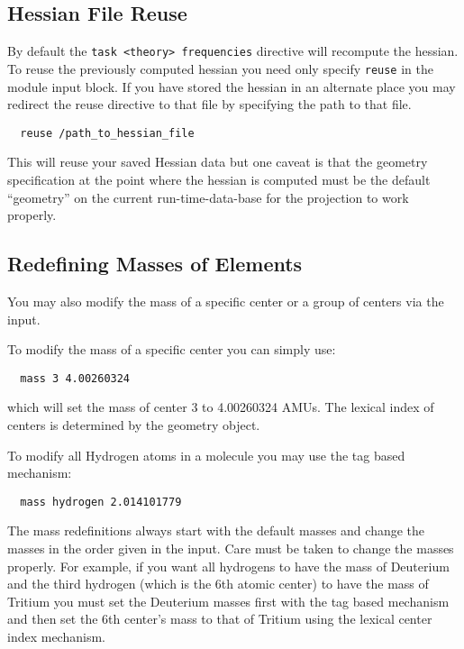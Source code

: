 \subsection{Hessian File Reuse}
By default the \verb+task <theory> frequencies+ directive will
recompute the hessian.  To reuse the previously computed hessian you
need only specify \verb+reuse+ in the module input block.  If you
have stored the hessian in an alternate place you may redirect the 
reuse directive to that file by specifying the path to that file.
\begin{verbatim}
  reuse /path_to_hessian_file
\end{verbatim}
This will reuse your saved Hessian data but one caveat is that the
geometry specification at the point where the hessian is computed must
be the default ``geometry'' on the current run-time-data-base for the
projection to work properly.

\subsection{Redefining Masses of Elements}
You may also modify the mass of a specific center or a group of
centers via the input.  

To modify the mass of a specific center you can simply use:
\begin{verbatim}
  mass 3 4.00260324
\end{verbatim}
which will set the mass of center 3 to 4.00260324 AMUs.  The lexical
index of centers is determined by the geometry object. 

To modify all Hydrogen atoms in a molecule you may use the tag based
mechanism:
\begin{verbatim}
  mass hydrogen 2.014101779
\end{verbatim}

The mass redefinitions always start with the default masses and
change the masses in the order given in the input.  Care must be taken to change
the masses properly.  For example, if you want all hydrogens to have
the mass of Deuterium and the third hydrogen (which is the 6th atomic
center) to have the mass of Tritium you must set the Deuterium masses
first with the tag based mechanism and then set the 6th center's mass
to that of Tritium using the lexical center index mechanism.  

